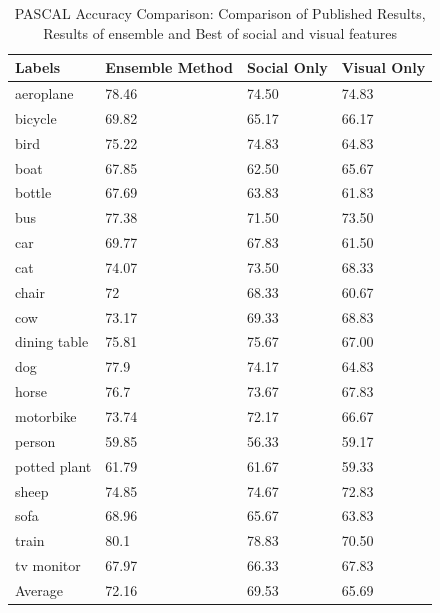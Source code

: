 \begin{table}
\centering
\caption{ PASCAL Accuracy Comparison: Comparison of Published Results, Results of ensemble and Best of social and visual features} %
\vspace*{0.2 cm}
\begin{tabular}{| p{1.7cm}| p{1.5cm}|p{1.2cm}|p{1.2cm}|} \hline
Labels & Ensemble Method & Social Only & Visual Only  \\  [1ex] \hline
aeroplane & 78.46 & 74.50 & 74.83 \\  [1ex] \hline
bicycle & 69.82 & 65.17 & 66.17 \\  [1ex] \hline
bird & 75.22 & 74.83 & 64.83 \\  [1ex] \hline
boat & 67.85 & 62.50 & 65.67 \\  [1ex] \hline
bottle & 67.69 & 63.83 & 61.83 \\  [1ex] \hline
bus & 77.38 & 71.50 & 73.50 \\  [1ex] \hline
car & 69.77 & 67.83 & 61.50 \\  [1ex] \hline
cat & 74.07 & 73.50 & 68.33 \\  [1ex] \hline
chair & 72 & 68.33 & 60.67 \\  [1ex] \hline
cow & 73.17 & 69.33 & 68.83 \\  [1ex] \hline
dining table & 75.81 & 75.67 & 67.00 \\  [1ex] \hline
dog & 77.9 & 74.17 & 64.83 \\  [1ex] \hline
horse & 76.7 & 73.67 & 67.83 \\  [1ex] \hline
motorbike & 73.74 & 72.17 & 66.67 \\  [1ex] \hline
person & 59.85 & 56.33 & 59.17 \\  [1ex] \hline
potted plant & 61.79 & 61.67 & 59.33 \\  [1ex] \hline
sheep & 74.85 & 74.67 & 72.83 \\  [1ex] \hline
sofa & 68.96 & 65.67 & 63.83 \\  [1ex] \hline
train & 80.1 & 78.83 & 70.50 \\  [1ex] \hline
tv monitor & 67.97 & 66.33 & 67.83 \\  [1ex] \hline
Average & 72.16 & 69.53 & 65.69 \\  [1ex] \hline
\end{tabular}
 \label{PASCALAccuracyOverAll} %
\end{table}




